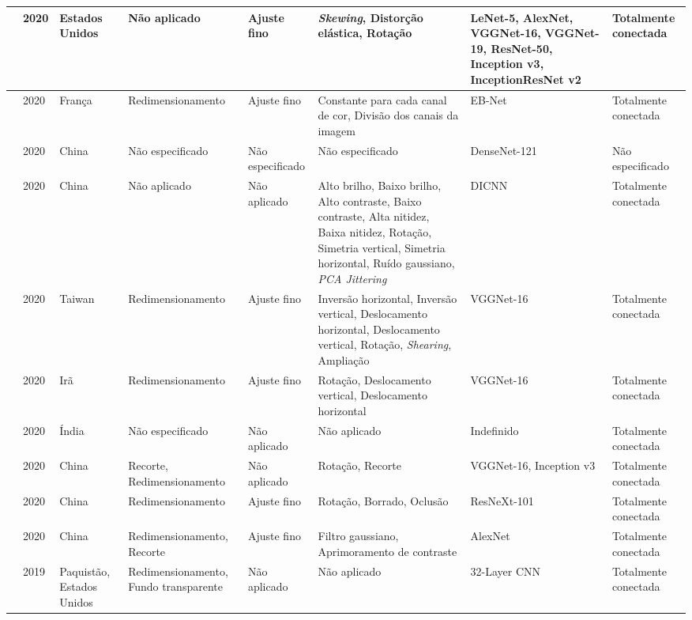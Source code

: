 \documentclass[
	12pt,				%
	oneside,			%
	a4paper,			%
	english,			%
	brazil				%
	]{abntex2ppgsi}
\begin{document}
\begin{landscape}
\begin{OnehalfSpacing}
\begin{footnotesize}
\begin{longtable}{|p{2.3cm}|p{1.3cm}|p{1.8cm}|p{3cm}|p{2.4cm}|p{4.3cm}|p{4.3cm}|p{2.5cm}|}
\cite{liu2020classification} &
  2020 &
  Estados Unidos &
  Não aplicado &
  Ajuste fino &
  \textit{Skewing}, Distorção elástica, Rotação &
  LeNet-5, AlexNet, VGGNet-16, VGGNet-19, ResNet-50, Inception v3, InceptionResNet v2 &
  Totalmente conectada \\ \hline
\cite{le2020automated} &
  2020 &
  França &
  Redimensionamento &
  Ajuste fino &
  Constante para cada canal de cor, Divisão dos canais da imagem &
  EB-Net &
  Totalmente conectada \\ \hline
\cite{zhangautomatic} &
  2020 &
  China &
  Não especificado &
  Não especificado &
  Não especificado &
  DenseNet-121 &
  Não especificado \\ \hline
\cite{liu2020grape} &
  2020 &
  China &
  Não aplicado &
  Não aplicado &
  Alto brilho, Baixo brilho, Alto contraste, Baixo contraste, Alta nitidez, Baixa nitidez, Rotação, Simetria vertical, Simetria horizontal, Ruído gaussiano, \textit{PCA Jittering} &
  DICNN &
  Totalmente conectada \\ \hline
\cite{lu2020identifying} &
  2020 &
  Taiwan &
  Redimensionamento &
  Ajuste fino &
  Inversão horizontal, Inversão vertical, Deslocamento horizontal, Deslocamento vertical, Rotação, \textit{Shearing}, Ampliação &
  VGGNet-16 &
  Totalmente conectada \\ \hline
\cite{banan2020deep} &
  2020 &
  Irã &
  Redimensionamento &
  Ajuste fino &
  Rotação, Deslocamento vertical, Deslocamento horizontal &
  VGGNet-16 &
  Totalmente conectada \\ \hline
\cite{tiwari2020comparative} &
  2020 &
  Índia &
  Não especificado &
  Não aplicado &
  Não aplicado &
  Indefinido &
  Totalmente conectada \\ \hline
\cite{li2020using} &
  2020 &
  China &
  Recorte, Redimensionamento &
  Não aplicado &
  Rotação, Recorte &
  VGGNet-16, Inception v3 &
  Totalmente conectada \\ \hline
\cite{chen2020research} &
  2020 &
  China &
  Redimensionamento &
  Ajuste fino &
  Rotação, Borrado, Oclusão &
  ResNeXt-101 &
  Totalmente conectada \\ \hline
\cite{hongclassification} &
  2020 &
  China &
  Redimensionamento, Recorte &
  Ajuste fino &
  Filtro gaussiano, Aprimoramento de contraste &
  AlexNet &
  Totalmente conectada \\ \hline
\cite{rauf2019visual} &
  2019 &
  Paquistão, Estados Unidos &
  Redimensionamento, Fundo transparente &
  Não aplicado &
  Não aplicado &
  32-Layer CNN &
  Totalmente conectada \\ \hline

\end{longtable}
\end{footnotesize}
\end{OnehalfSpacing}
\end{landscape}
\end{document}
